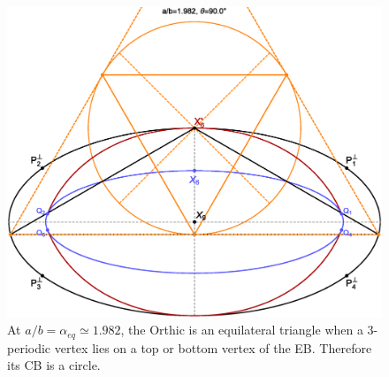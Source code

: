 \begin{figure}
    \centering
    \includegraphics[width=\textwidth]{pics_eps_new/0040_cb_ort_equi.eps}
    \caption{At $a/b=\alpha_{eq}{\simeq}1.982$, the Orthic is an equilateral triangle when a 3-periodic vertex lies on a top or bottom vertex of the EB. Therefore its CB is a circle.}
    \label{fig:cb_ort_equi}
\end{figure}
